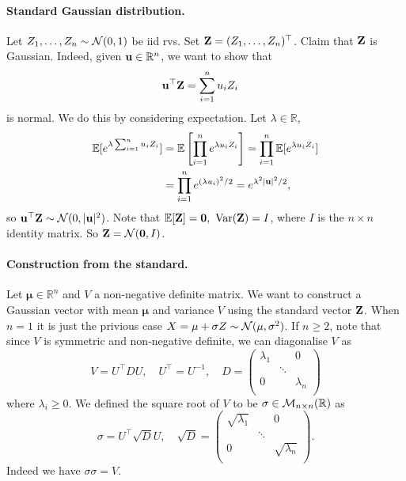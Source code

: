\paragraph{Standard Gaussian distribution.} Let $ Z_1,\dots,Z_n \sim {\mathcal{N}}(0,1) $ be iid rvs. Set $ {\bf Z} = (Z_1,\dots,Z_n)^\top  $. Claim that ${\bf Z}$ is Gaussian. Indeed, given $ {\bf u}\in \mathbb{R}^{n} $, we want to show that
\begin{align*}
    {\bf u}^\top{\bf Z} &= \sum_{i=1}^{n} u_i Z_i
\end{align*}
is normal. We do this by considering expectation. Let $ \lambda\in \mathbb{R} $, 
\begin{align*}
    {\mathbb{E}}[ e^{\lambda \sum_{i=1}^{n}u_iZ_i}] &= {\mathbb{E}} \left[ \prod_{i=1}^{n} e^{\lambda u_i Z_i} \right] = \prod_{i=1}^{n}{\mathbb{E}}[e^{\lambda u_i Z_i}]\\ 
    &= \prod_{i=1}^{n} e^{(\lambda u_i)^2/2} = e^{\lambda^2|{\bf u}|^2/2},
\end{align*}
so $ {\bf u}^\top {\bf Z} \sim {\mathcal{N}}(0,|{\bf u}|^2) $. Note that $ {\mathbb{E}}[{\bf Z}]=\mathbf{0},\ \operatorname{Var}({\bf Z})= I $, where $I$ is the $n\times n$ identity matrix. So $ {\bf Z} = {\mathcal{N}}(\mathbf{0}, I) $.

\paragraph{Construction from the standard.} Let $ \boldsymbol{\mu}\in \mathbb{R}^{n} $ and $ V $ a non-negative definite matrix. We want to construct a Gaussian vector with mean $ \boldsymbol{\mu} $ and variance $ V $ using the standard vector $ {\bf Z} $. When $n=1$ it is just the privious case $ X=\mu+\sigma Z \sim {\mathcal{N}}(\mu,\sigma^2) $. If $ n\ge 2 $, note that since $V$ is symmetric and non-negative definite, we can diagonalise $V$ as 
\[
    V = U^\top D U,\quad U^\top =U^{-1},\quad D= \begin{pmatrix}
        \lambda_1 &  & 0 \\
         & \ddots  &  \\
        0 &  & \lambda_n \\
    \end{pmatrix}
\]
where $ \lambda_i\ge 0 $. We defined the square root of $V$ to be $ \sigma\in {\mathcal{M}}_{n \times n}({\mathbb{R}}) $ as 
\[
    \sigma = U^\top \sqrt{D} U,\quad \sqrt{D}= \begin{pmatrix}
        \sqrt{\lambda_1} &  & 0 \\
         & \ddots  &  \\
        0 &  & \sqrt{\lambda_n} \\
    \end{pmatrix}.
\]
Indeed we have $ \sigma \sigma = V $.

